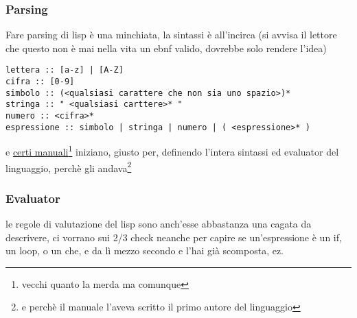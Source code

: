 \documentclass[11pt]{article}
\begin{document}
\subsubsection{Parsing}
\label{sec:orgdbc8b27}
Fare parsing di lisp è una minchiata, la sintassi è all'incirca (si avvisa il lettore che questo non è mai nella vita un ebnf valido, dovrebbe solo rendere l'idea)
\begin{verbatim}
lettera :: [a-z] | [A-Z]
cifra :: [0-9]
simbolo :: (<qualsiasi carattere che non sia uno spazio>)*
stringa :: " <qualsiasi carttere>* "
numero :: <cifra>*
espressione :: simbolo | stringa | numero | ( <espressione>* )
\end{verbatim}

e \href{https://www.softwarepreservation.org/projects/LISP/book/LISP\%201.5\%20Programmers\%20Manual.pdf}{certi manuali}\footnote{vecchi quanto la merda ma comunque} iniziano, giusto per, definendo l'intera sintassi ed evaluator del linguaggio, perchè gli andava\footnote{e perchè il manuale l'aveva scritto il primo autore del linguaggio\footnotemark}

\subsubsection{Evaluator}
\label{sec:org53e6f0d}
le regole di valutazione del lisp sono anch'esse abbastanza una cagata da descrivere, ci vorrano sui 2/3 check neanche per capire se un'espressione è un if, un loop, o un che, e da lì mezzo secondo e l'hai già scomposta, ez.
\end{document}
